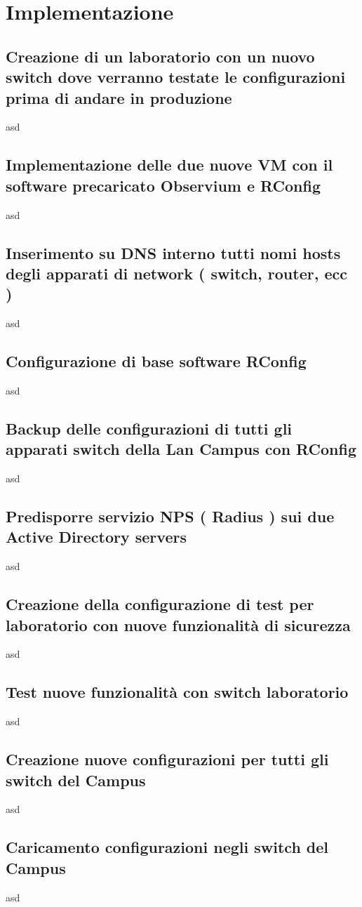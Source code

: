 \documentclass[Realizzazione.tex]{subfiles}
\begin{document}
\section{Implementazione}

\subsection{Creazione di un laboratorio con un nuovo switch dove verranno testate le configurazioni prima di andare in produzione}
asd
\subsection{Implementazione delle due nuove VM con il software precaricato Observium e RConfig}
asd
\subsection{Inserimento su DNS interno tutti nomi hosts degli apparati di network ( switch, router, ecc )} 
asd
\subsection{Configurazione di base software RConfig} 
asd
\subsection{Backup delle configurazioni di tutti gli apparati switch della Lan Campus con RConfig} 
asd
\subsection{Predisporre servizio NPS ( Radius ) sui due Active Directory servers} 
asd
\subsection{Creazione della configurazione di test per laboratorio con nuove funzionalità di sicurezza} 
asd
\subsection{Test nuove funzionalità con switch laboratorio} 
asd
\subsection{Creazione nuove configurazioni per tutti gli switch del Campus} 
asd
\subsection{Caricamento configurazioni negli switch del Campus} 
asd
\end{document}
